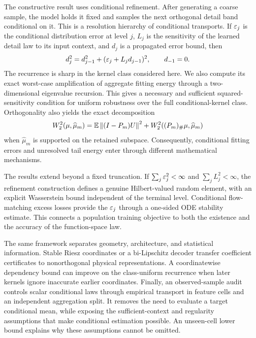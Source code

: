 The constructive result uses conditional refinement. After generating a coarse sample, the model holds it fixed and samples the next orthogonal detail band conditional on it. This is a resolution hierarchy of conditional transports. If $\varepsilon_j$ is the conditional distribution error at level $j$, $L_j$ is the sensitivity of the learned detail law to its input context, and $d_j$ is a propagated error bound, then
\begin{equation}\label{eq:intro-recurrence}
 d_j^2=d_{j-1}^2+(\varepsilon_j+L_jd_{j-1})^2,
 \qquad d_{-1}=0.
\end{equation}
The recurrence is sharp in the kernel class considered here. We also compute its exact worst-case amplification of aggregate fitting energy through a two-dimensional eigenvalue recursion. This gives a necessary and sufficient squared-sensitivity condition for uniform robustness over the full conditional-kernel class. Orthogonality also yields the exact decomposition
\begin{equation}\label{eq:intro-tail}
 W_2^2(\mu,\widehat\mu_m)
 =\mathbb E\left\lVert(I-P_m)U\right\rVert^2+W_2^2((P_m)_{\#}\mu,\widehat\mu_m)
\end{equation}
when $\widehat\mu_m$ is supported on the retained subspace. Consequently, conditional fitting errors and unresolved tail energy enter through different mathematical mechanisms.

The results extend beyond a fixed truncation. If $\sum_j\varepsilon_j^2<\infty$ and $\sum_jL_j^2<\infty$, the refinement construction defines a genuine Hilbert-valued random element, with an explicit Wasserstein bound independent of the terminal level. Conditional flow-matching excess losses provide the $\varepsilon_j$ through a one-sided ODE stability estimate. This connects a population training objective to both the existence and the accuracy of the function-space law.

The same framework separates geometry, architecture, and statistical information. Stable Riesz coordinates or a bi-Lipschitz decoder transfer coefficient certificates to nonorthogonal physical representations. A coordinatewise dependency bound can improve on the class-uniform recurrence when later kernels ignore inaccurate earlier coordinates. Finally, an observed-sample audit controls scalar conditional laws through empirical transport in feature cells and an independent aggregation split. It removes the need to evaluate a target conditional mean, while exposing the sufficient-context and regularity assumptions that make conditional estimation possible. An unseen-cell lower bound explains why these assumptions cannot be omitted.

